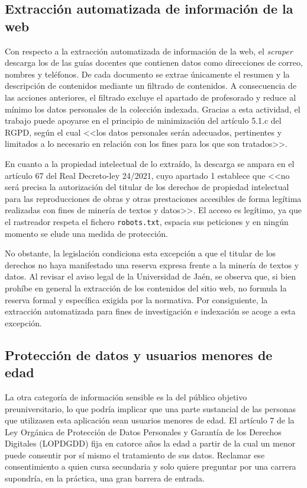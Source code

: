\subsection{Extracción automatizada de información de la web}

Con respecto a la extracción automatizada de información de la web, el \textit{scraper} descarga los  de las guías docentes que contienen datos como direcciones de correo, nombres y teléfonos. De cada documento se extrae únicamente el resumen y la descripción de contenidos mediante un filtrado de contenidos. A consecuencia de las acciones anteriores, el filtrado excluye el apartado de profesorado y reduce al mínimo los datos personales de la colección indexada. Gracias a esta actividad, el trabajo puede apoyarse en el principio de minimización del artículo 5.1.c del RGPD\cite{rgpd2016}, según el cual <<los datos personales serán adecuados, pertinentes y limitados a lo necesario en relación con los fines para los que son tratados>>.

En cuanto a la propiedad intelectual de lo extraído, la descarga se ampara en el artículo 67 del Real Decreto-ley 24/2021\cite{rdl24_2021}, cuyo apartado 1 establece que <<no será precisa la autorización del titular de los derechos de propiedad intelectual para las reproducciones de obras y otras prestaciones accesibles de forma legítima realizadas con fines de minería de textos y datos>>. El acceso es legítimo, ya que el rastreador respeta el fichero \texttt{robots.txt}, espacia sus peticiones y en ningún momento se elude una medida de protección.

No obstante, la legislación condiciona esta excepción a que el titular de los derechos no haya manifestado una reserva expresa frente a la minería de textos y datos. Al revisar el aviso legal de la  Universidad de Jaén\cite{uja_avisolegal}, se observa que, si bien prohíbe en general la extracción de los contenidos del sitio web, no formula la reserva formal y específica exigida por la normativa. Por consiguiente, la extracción automatizada para fines de investigación e indexación se acoge a esta excepción.


\subsection{Protección de datos y usuarios menores de edad}

La otra categoría de información sensible es la del público objetivo preuniversitario, lo que podría implicar que una parte sustancial de las personas que utilizasen esta aplicación sean usuarios menores de edad. El artículo 7 de la Ley Orgánica de Protección de Datos Personales y Garantía de los Derechos Digitales (LOPDGDD)\cite{lopdgdd2018} fija en catorce años la edad a partir de la cual un menor puede consentir por sí mismo el tratamiento de sus datos. Reclamar ese consentimiento a quien cursa secundaria y solo quiere preguntar por una carrera supondría, en la práctica, una gran barrera de entrada.

